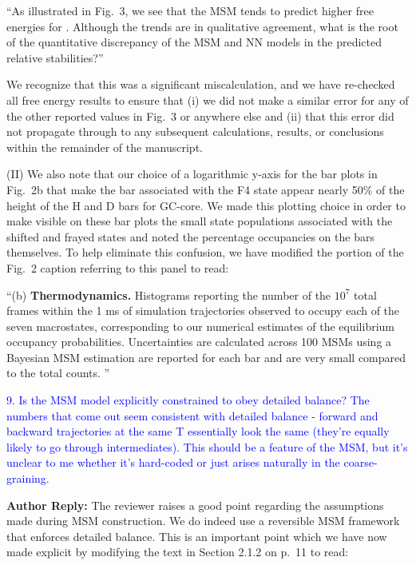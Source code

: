 \documentclass[11pt,a4paper]{letter} %
\newcommand*{\rood}[1]{{\color{red}{#1}}}
\begin{document}
``As illustrated in Fig.~3, we see that the MSM tends to predict higher free energies for \rood{all macrostates relative to the H state compared to the NN model}. Although the trends are in qualitative agreement, what is the root of the quantitative discrepancy of the MSM and NN models in the predicted relative stabilities?''

We recognize that this was a significant miscalculation, and we have re-checked all free energy results to ensure that (i) we did not make a similar error for any of the other reported values in Fig.~3 or anywhere else and (ii) that this error did not propagate through to any subsequent calculations, results, or conclusions within the remainder of the manuscript.



(II) We also note that our choice of a logarithmic y-axis for the bar plots in Fig.~2b that make the bar associated with the F4 state appear nearly 50\% of the height of the H and D bars for GC-core. We made this plotting choice in order to make visible on these bar plots the small state populations associated with the shifted and frayed states and noted the percentage occupancies on the bars themselves. To help eliminate this confusion, we have modified the portion of the Fig.~2 caption referring to this panel to read: 

``(b) \textbf{Thermodynamics.} Histograms reporting the number of the $10^7$ total frames within the 1 ms of simulation trajectories observed to occupy each of the seven macrostates, corresponding to our numerical estimates of the equilibrium occupancy probabilities. Uncertainties are calculated across 100 MSMs using a Bayesian MSM estimation are reported for each bar and are very small compared to the total counts. \rood{Values are reported on a log y-axis to make the small populations of the shifted and frayed states visible.}''




\textcolor{blue}{9. Is the MSM model explicitly constrained to obey detailed balance? The numbers that come out seem consistent with detailed balance - forward and backward trajectories at the same T essentially look the same (they're equally likely to go through intermediates). This should be a feature of the MSM, but it's unclear to me whether it's hard-coded or just arises naturally in the coarse-graining.}

\textbf{Author Reply:}    The reviewer raises a good point regarding the assumptions made during MSM construction. We do indeed use a reversible MSM framework that enforces detailed balance. This is an important point which we have now made explicit by modifying the text in Section 2.1.2 on p.~11 to read:
\end{document}
